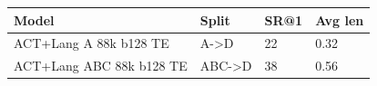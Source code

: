 \begin{tabular}{llll}
\toprule
Model & Split & SR@1 & Avg len \\
\midrule
ACT+Lang A 88k b128 TE & A->D & 22 & 0.32 \\
ACT+Lang ABC 88k b128 TE & ABC->D & 38 & 0.56 \\
\bottomrule
\end{tabular}
